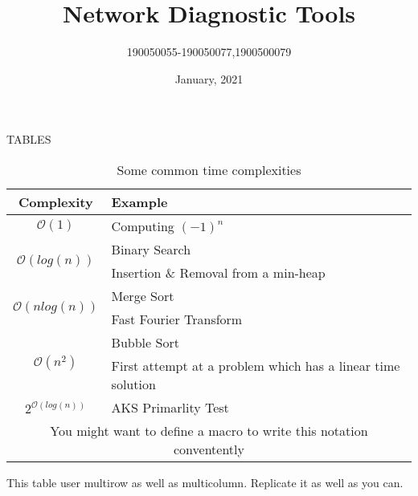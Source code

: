 \documentclass{article}
\theoremstyle{remark}
\newcommand{\y}[1]{\mathcal{O}(#1)}
\begin{document}
\title{Network Diagnostic Tools}
\author{190050055-190050077,1900500079}
\date{January, 2021}
\maketitle
\thispagestyle{empty}
\clearpage
{}



\large{TABLES}

\begin{table}[H]
    \centering
    \begin{tabular}{c|l}
         \hline
         \textbf{Complexity} & \textbf{Example}\\
         \hline
         $\y1$& Computing $(-1)^n$ \\
         \hline
         \multirow{2}{*}{$\y {log(n)}$} & Binary Search\\
         &Insertion \& Removal from a min-heap\\
         \hline
         \multirow{2}{*}{$\y {nlog(n)}$} & Merge Sort \\
         & Fast Fourier Transform \\
         \hline
         \multirow{2}{*}{$\y {n^2}$} & Bubble Sort \\
         & First attempt at a problem which has a linear time solution\\
         \hline
         $2^{\y{log(n)}} $ & AKS Primarlity Test\\
         \hline
         \multicolumn{2}{c}{You might want to define a macro to write this notation conventently }\\
         \hline
         
          
    \end{tabular}
    \caption{Some common time complexities}
    \label{Table 1:}
\end{table}
  
  
This table user multirow as well as multicolumn. Replicate it as well as you can.
\end{document}
